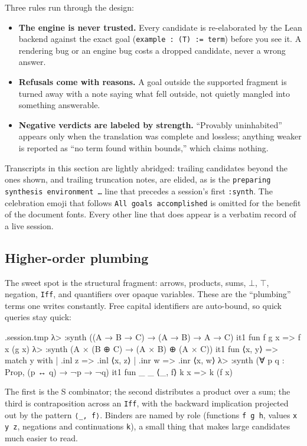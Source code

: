 \documentclass[11pt,oneside]{article}
\newcommand{\code}[1]{\texttt{#1}}
\newenvironment{session}
 {\VerbatimEnvironment\begin{VerbatimOut}{\jobname.session.tmp}}
 {\end{VerbatimOut}%
  \begin{sessionouter}%
  \VerbatimInput[fontsize=\footnotesize, breaklines=true,
    breaksymbolleft={\textcolor{stone}{\footnotesize$\hookrightarrow$}},
    formatcom=\color{ink}, tabsize=4]{\jobname.session.tmp}%
  \end{sessionouter}}
\begin{document}
Three rules run through the design:

\begin{itemize}
\item \textbf{The engine is never trusted.} Every candidate is
  re-elaborated by the Lean backend against the exact goal
  (\code{example :\ (T) :=\ term}) before you see it. A rendering bug
  or an engine bug costs a dropped candidate, never a wrong answer.
\item \textbf{Refusals come with reasons.} A goal outside the
  supported fragment is turned away with a note saying what fell
  outside, not quietly mangled into something answerable.
\item \textbf{Negative verdicts are labeled by strength.}
  ``Provably uninhabited'' appears only when the translation was
  complete and lossless; anything weaker is reported as ``no term
  found within bounds,'' which claims nothing.
\end{itemize}

Transcripts in this section are lightly abridged: trailing candidates
beyond the ones shown, and trailing truncation notes, are elided, as is
the \code{preparing synthesis environment \dots} line that precedes a
session's first \code{:synth}.  The celebration emoji that follows
\code{All goals accomplished} is omitted for the benefit of the
document fonts.  Every other line that does appear is a verbatim record
of a live session.

\subsection{Higher-order plumbing}\label{sec:plumbing}

The sweet spot is the structural fragment: arrows, products, sums,
$\bot$, $\top$, negation, \code{Iff}, and quantifiers over opaque
variables. These are the ``plumbing'' terms one writes constantly.
Free capital identifiers are auto-bound, so quick queries stay quick:

\begin{session}
λ> :synth ((A → B → C) → (A → B) → A → C)
  it1  fun f g x => f x (g x)
λ> :synth (A × (B ⊕ C) → (A × B) ⊕ (A × C))
  it1  fun ⟨x, y⟩ => match y with | .inl z => .inl ⟨x, z⟩ | .inr w => .inr ⟨x, w⟩
λ> :synth (∀ p q : Prop, (p ↔ q) → ¬p → ¬q)
  it1  fun _ _ ⟨_, f⟩ k x => k (f x)
\end{session}

The first is the S combinator; the second distributes a product over a
sum; the third is contraposition across an \code{Iff}, with the
backward implication projected out by the pattern
\code{⟨\_, f⟩}. Binders are named by role (functions \code{f g h},
values \code{x y z}, negations and continuations \code{k}), a small
thing that makes large candidates much easier to read.
\end{document}
